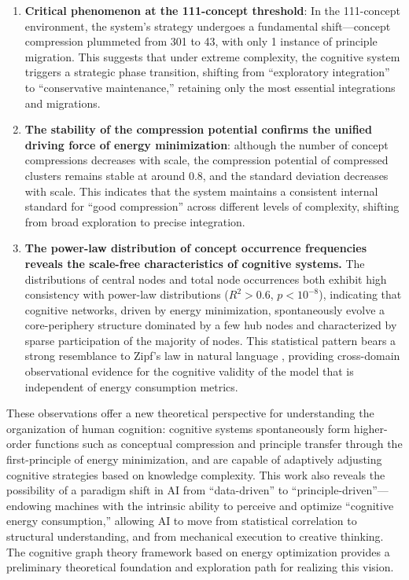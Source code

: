 \documentclass[10pt,onecolumn]{article}
\begin{document}
\begin{enumerate}
    \item \textbf{Critical phenomenon at the 111-concept threshold}: In the 111-concept environment, the system’s strategy undergoes a fundamental shift—concept compression plummeted from 301 to 43, with only 1 instance of principle migration. This suggests that under extreme complexity, the cognitive system triggers a strategic phase transition, shifting from “exploratory integration” to “conservative maintenance,” retaining only the most essential integrations and migrations.

    \item \textbf{The stability of the compression potential confirms the unified driving force of energy minimization}: although the number of concept compressions decreases with scale, the compression potential of compressed clusters remains stable at around 0.8, and the standard deviation decreases with scale. This indicates that the system maintains a consistent internal standard for “good compression” across different levels of complexity, shifting from broad exploration to precise integration.

    \item \textbf{The power-law distribution of concept occurrence frequencies reveals the scale-free characteristics of cognitive systems.} The distributions of central nodes and total node occurrences both exhibit high consistency with power-law distributions ($R^2>0.6$, $p<10^{-8}$), indicating that cognitive networks, driven by energy minimization, spontaneously evolve a core-periphery structure dominated by a few hub nodes and characterized by sparse participation of the majority of nodes. This statistical pattern bears a strong resemblance to Zipf’s law in natural language \citep{zipf1949human}, providing cross-domain observational evidence for the cognitive validity of the model that is independent of energy consumption metrics.
\end{enumerate}

These observations offer a new theoretical perspective for understanding the organization of human cognition: cognitive systems spontaneously form higher-order functions such as conceptual compression and principle transfer through the first-principle of energy minimization, and are capable of adaptively adjusting cognitive strategies based on knowledge complexity. This work also reveals the possibility of a paradigm shift in AI from “data-driven” to “principle-driven”—endowing machines with the intrinsic ability to perceive and optimize “cognitive energy consumption,” allowing AI to move from statistical correlation to structural understanding, and from mechanical execution to creative thinking. The cognitive graph theory framework based on energy optimization provides a preliminary theoretical foundation and exploration path for realizing this vision.
\end{document}
